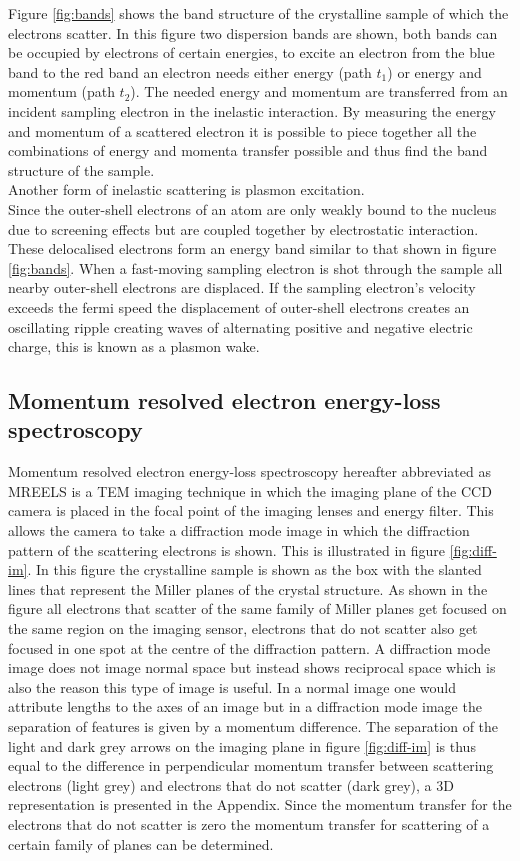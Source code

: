 Figure \ref{fig:bands} shows the band structure of the crystalline sample of which the electrons scatter. In this figure two dispersion bands are shown, both bands can be occupied by electrons of certain energies, to excite an electron from the blue band to the red band an electron needs either energy (path $t_1$) or energy and momentum (path $t_2$).
The needed energy and momentum are transferred from an incident sampling electron in the inelastic interaction. By measuring the energy and momentum of a scattered electron it is possible to piece together all the combinations of energy and momenta transfer possible and thus find the band structure of the sample.\\
Another form of inelastic scattering is plasmon excitation.\\
Since the outer-shell electrons of an atom are only weakly bound to the nucleus due to screening effects but are coupled together by electrostatic interaction. These delocalised electrons form an energy band similar to that shown in figure \ref{fig:bands}.
When a fast-moving sampling electron is shot through the sample all nearby outer-shell electrons are displaced. If the sampling electron's velocity exceeds the fermi speed the displacement of outer-shell electrons creates an oscillating ripple creating waves of alternating positive and negative electric charge, this is known as a plasmon wake.\cite{Egerton_2008}

\subsection{Momentum resolved electron energy-loss spectroscopy}
\label{sec:MREELS}
Momentum resolved electron energy-loss spectroscopy hereafter abbreviated as MREELS is a TEM imaging technique in which the imaging plane of the CCD camera is placed in the focal point of the imaging lenses and energy filter.
This allows the camera to take a diffraction mode image in which the diffraction pattern of the scattering electrons is shown. This is illustrated in figure \ref{fig:diff-im}. In this figure the crystalline sample is shown as the box with the slanted lines that represent the Miller planes of the crystal structure.
As shown in the figure all electrons that scatter of the same family of Miller planes get focused on the same region on the imaging sensor, electrons that do not scatter also get focused in one spot at the centre of the diffraction pattern.
A diffraction mode image does not image normal space but instead shows reciprocal space which is also the reason this type of image is useful. In a normal image one would attribute lengths to the axes of an image but in a diffraction mode image the separation of features is given by a momentum difference.
The separation of the light and dark grey arrows on the imaging plane in figure \ref{fig:diff-im} is thus equal to the difference in perpendicular momentum transfer between scattering electrons (light grey) and electrons that do not scatter (dark grey), a 3D representation is presented in the Appendix.
Since the momentum transfer for the electrons that do not scatter is zero the momentum transfer for scattering of a certain family of planes can be determined.

